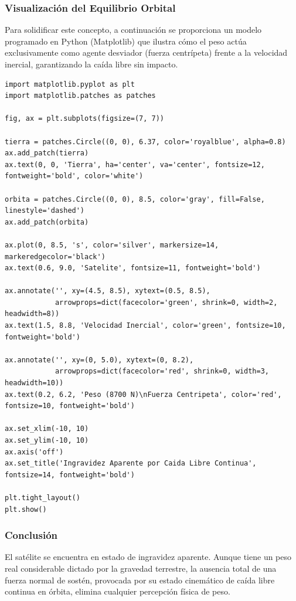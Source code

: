 \documentclass[12pt]{article}
\begin{document}
\subsubsection*{Visualización del Equilibrio Orbital}
Para solidificar este concepto, a continuación se proporciona un modelo programado en Python (Matplotlib) que ilustra cómo el peso actúa exclusivamente como agente desviador (fuerza centrípeta) frente a la velocidad inercial, garantizando la caída libre sin impacto.

\begin{lstlisting}
import matplotlib.pyplot as plt
import matplotlib.patches as patches

fig, ax = plt.subplots(figsize=(7, 7))

tierra = patches.Circle((0, 0), 6.37, color='royalblue', alpha=0.8)
ax.add_patch(tierra)
ax.text(0, 0, 'Tierra', ha='center', va='center', fontsize=12, fontweight='bold', color='white')

orbita = patches.Circle((0, 0), 8.5, color='gray', fill=False, linestyle='dashed')
ax.add_patch(orbita)

ax.plot(0, 8.5, 's', color='silver', markersize=14, markeredgecolor='black')
ax.text(0.6, 9.0, 'Satelite', fontsize=11, fontweight='bold')

ax.annotate('', xy=(4.5, 8.5), xytext=(0.5, 8.5),
            arrowprops=dict(facecolor='green', shrink=0, width=2, headwidth=8))
ax.text(1.5, 8.8, 'Velocidad Inercial', color='green', fontsize=10, fontweight='bold')

ax.annotate('', xy=(0, 5.0), xytext=(0, 8.2),
            arrowprops=dict(facecolor='red', shrink=0, width=3, headwidth=10))
ax.text(0.2, 6.2, 'Peso (8700 N)\nFuerza Centripeta', color='red', fontsize=10, fontweight='bold')

ax.set_xlim(-10, 10)
ax.set_ylim(-10, 10)
ax.axis('off')
ax.set_title('Ingravidez Aparente por Caida Libre Continua', fontsize=14, fontweight='bold')

plt.tight_layout()
plt.show()
\end{lstlisting}

\subsubsection*{Conclusión}
El satélite se encuentra en estado de ingravidez aparente. Aunque tiene un peso real considerable dictado por la gravedad terrestre, la ausencia total de una fuerza normal de sostén, provocada por su estado cinemático de caída libre continua en órbita, elimina cualquier percepción física de peso.
\end{document}
